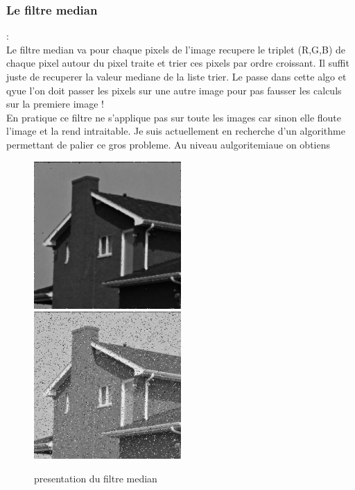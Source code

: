 \documentclass{article}
\begin{document}
\subsubsection{Le filtre median}
:\\
Le filtre median va pour chaque pixels de l'image recupere le triplet (R,G,B) de chaque pixel autour du pixel traite et trier ces pixels par ordre croissant. Il suffit juste de recuperer la valeur mediane de la liste trier. Le passe dans cette algo et qyue l'on doit passer les pixels sur une autre image pour pas fausser les calculs sur la premiere image !
\\
En pratique ce filtre ne s'applique pas sur toute les images car sinon elle floute l'image et la rend intraitable. Je suis actuellement en recherche d'un algorithme permettant de palier ce gros probleme. Au niveau aulgoritemiaue on obtiens
\begin{figure}[h]
\includegraphics[width=0.50\textwidth]{img/house.png}
\includegraphics[width=0.50\textwidth]{img/house.jpg}
\caption{presentation du filtre median}
\end{figure}
\end{document}
